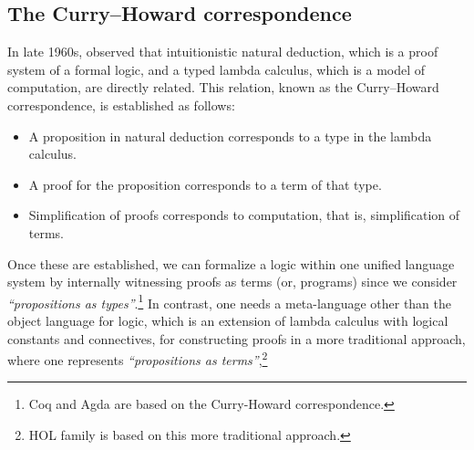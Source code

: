 \subsection{The Curry--Howard correspondence}
In late 1960s, \citet{Howard69} observed that intuitionistic natural deduction,
which is a proof system of a formal logic, and a typed lambda calculus,
which is a model of computation, are directly related. This relation,
known as the Curry--Howard correspondence, is established as follows:
\begin{itemize}
\item A proposition in natural deduction corresponds to
        a type in the lambda calculus.
\item A proof for the proposition corresponds to
        a term of that type.
\item Simplification of proofs corresponds to computation,
        that is, simplification of terms.
\end{itemize}
Once these are established, we can formalize a logic within
one unified language system by internally witnessing proofs as terms
(or, programs) since we consider \emph{``propositions as types''}.\footnote{
	Coq and Agda are based on the Curry-Howard correspondence.}
In contrast, one needs a meta-language other than the object language for logic,
which is an extension of lambda calculus with logical constants and connectives,
for constructing proofs in a more traditional approach, where one represents
\emph{``propositions as terms''},\footnote{
	HOL family is based on this more traditional approach.}

